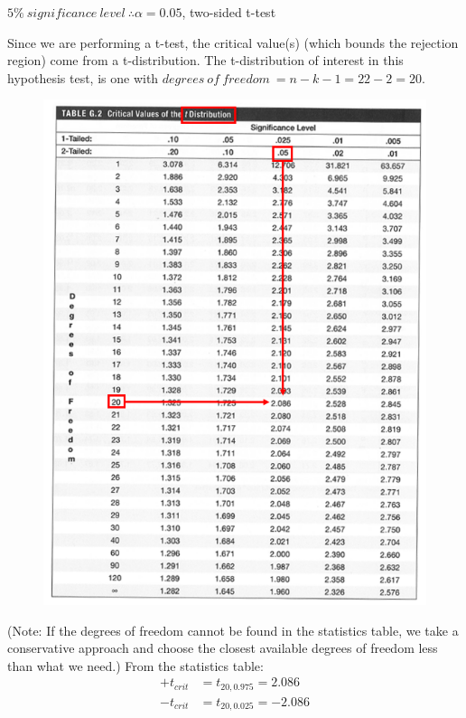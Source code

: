 \documentclass[12pt]{report}
\begin{document}
\noindent $5\%\ significance\ level\ \therefore \alpha = 0.05$, two-sided t-test

\noindent Since we are performing a t-test, the critical value(s) (which bounds the rejection region) come from a t-distribution. The t-distribution of interest in this hypothesis test, is one with $degrees\ of\ freedom\ = n - k - 1 = 22 - 2 = 20$. 


\begin{figure}[H]
	\centering
	\includegraphics{tute6_q1_4}
\end{figure}
\vspace{-\baselineskip} \noindent (Note: If the degrees of freedom cannot be found in the statistics table, we take a conservative approach and choose the closest available degrees of freedom less than what we need.)
\noindent From the statistics table: \begin{align*}
	+t_{crit} &= t_{20,0.975} = 2.086 \\
	-t_{crit} &= t_{20,0.025} = -2.086
\end{align*}
\end{document}
